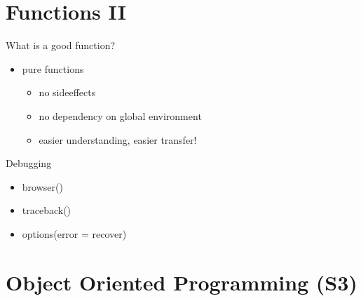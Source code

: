 \documentclass[xcolor=table]{beamer}\usepackage[]{graphicx}\usepackage[]{color}
\begin{document}
\section{Functions II}

\begin{frame}{What is a good function?}
\begin{itemize}
  \item pure functions
  \begin{itemize}
    \item no sideeffects
    \item no dependency on global environment
    \item easier understanding, easier transfer!
  \end{itemize}
\end{itemize}
\end{frame}

\begin{frame}{Debugging}
\begin{itemize}
  \item browser()
  \item traceback()
  \item options(error = recover)
\end{itemize}
\end{frame}

\section{Object Oriented Programming (S3)}
\end{document}
